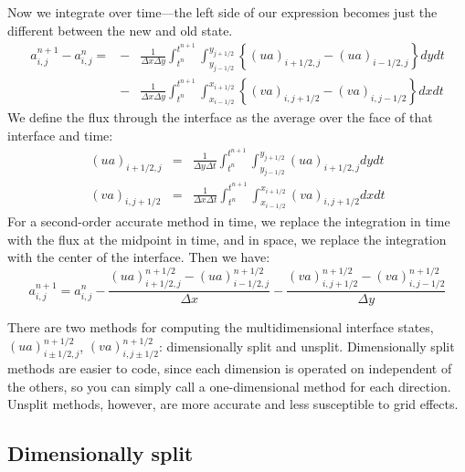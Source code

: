 Now we integrate over time---the left side of our expression becomes
just the different between the new and old state.
\begin{eqnarray}
 a_{i,j}^{n+1} - a_{i,j}^n = 
  &-& \frac{1}{\Delta x\Delta y} \int_{t^n}^{t^{n+1}} \int_{y_{j-1/2}}^{y_{j+1/2}}
     \left \{ (u a)_{i+1/2,j} - (u a)_{i-1/2,j} \right \} dy dt \nonumber \\
  &-& \frac{1}{\Delta x\Delta y} \int_{t^n}^{t^{n+1}} \int_{x_{i-1/2}}^{x_{i+1/2}}
     \left \{ (v a)_{i,j+1/2} - (v a)_{i,j-1/2} \right \} dx dt
\label{eq:update2du}
\end{eqnarray}
We define the flux through the interface as the average over the face
of that interface and time:
\begin{eqnarray}
(ua)_{i+1/2,j} &=& \frac{1}{\Delta y \Delta t}
    \int_{t^n}^{t^{n+1}} \int_{y_{j-1/2}}^{y_{j+1/2}} (ua)_{i+1/2,j} dy dt  \\
(va)_{i,j+1/2} &=& \frac{1}{\Delta x \Delta t}
    \int_{t^n}^{t^{n+1}} \int_{x_{i-1/2}}^{x_{i+1/2}} (va)_{i,j+1/2} dx dt 
\end{eqnarray}
For a second-order accurate method in time, we replace the integration in
time with the flux at the midpoint in time, and in space, we replace
the integration with the center of the interface.  Then we have:
\begin{equation}
a_{i,j}^{n+1} = a_{i,j}^n - 
   \frac{(ua)_{i+1/2,j}^{n+1/2} - (ua)_{i-1/2,j}^{n+1/2}}{\Delta x} -
   \frac{(va)_{i,j+1/2}^{n+1/2} - (va)_{i,j-1/2}^{n+1/2}}{\Delta y}
\end{equation}

There are two methods for computing the multidimensional interface states, 
$(ua)_{i\pm1/2,j}^{n+1/2}$, $(va)_{i,j\pm1/2}^{n+1/2}$:
dimensionally split and unsplit.  Dimensionally split methods are
easier to code, since each dimension is operated on independent of the
others, so you can simply call a one-dimensional method for each
direction.  Unsplit methods, however, are more accurate and less
susceptible to grid effects.

\subsection{Dimensionally split}

